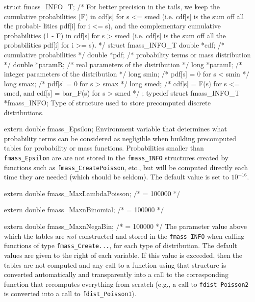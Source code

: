 struct fmass_INFO_T;
\hide
/*
   For better precision in the tails, we keep the cumulative probabilities
   (F) in cdf[s] for s <= smed (i.e. cdf[s] is the sum off all the probabi-
   lities pdf[i] for i <= s),
   and the complementary cumulative probabilities (1 - F) in cdf[s] for
   s > smed (i.e. cdf[s] is the sum off all the probabilities pdf[i]
   for i >= s).
*/ 
struct fmass_INFO_T {
   double *cdf;                    /* cumulative probabilities */
   double *pdf;                    /* probability terms or mass distribution */
   double *paramR;                 /* real parameters of the distribution */
   long *paramI;                   /* integer parameters of the distribution */
   long smin;                      /* pdf[s] = 0 for s < smin */
   long smax;                      /* pdf[s] = 0 for s > smax */  
   long smed;                      /* cdf[s] = F(s) for s <= smed, and 
                                      cdf[s] = bar_F(s) for s > smed */
};
\endhide
typedef struct fmass_INFO_T *fmass_INFO;
\endcode
 \tab Type of structure used to store precomputed discrete distributions.
 \endtab

\newpage
\ifdetailed  %

\code

extern double fmass_Epsilon;
\endcode
 \tab Environment variable that determines what probability terms can
  be considered as negligible when building precomputed tables for
  probability or mass functions.
  Probabilities smaller than {\tt fmass\_Epsilon} are
  are not stored in the {\tt fmass\_INFO} structures created by functions
  such as {\tt fmass\_CreatePoisson}, etc., but will be computed directly
  each time they are needed (which should be seldom).
  The default value is set to $10^{-16}$.
 \endtab
\code

extern double fmass_MaxLambdaPoisson;  /* = 100000  */

extern double fmass_MaxnBinomial;      /* = 100000  */

extern double fmass_MaxnNegaBin;       /* = 100000  */
\endcode
 \tab The parameter value above which the tables are {\em not\/} 
  constructed and stored in the {\tt fmass\_INFO} when calling 
  functions of type {\tt fmass\_Create...}, for each type of distribution.
  The default values are given to the right of each variable.
  If this value is exceeded, then the tables are not computed and 
  any call to a function using that structure is converted automatically 
  and transparently into a call to the corresponding function that 
  recomputes everything from scratch 
  (e.g., a call to {\tt fdist\_Poisson2} is converted into
  a call to {\tt fdist\_Poisson1}).
 \endtab
\fi  %

